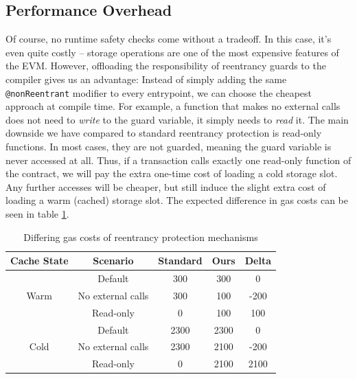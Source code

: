 \subsection{Performance Overhead}

Of course, no runtime safety checks come without a tradeoff. In this case, it's even quite costly -- storage operations are one of the most expensive features of the EVM. However, offloading the responsibility of reentrancy guards to the compiler gives us an advantage: Instead of simply adding the same \lstinline{@nonReentrant} modifier to every entrypoint, we can choose the cheapest approach at compile time. For example, a function that makes no external calls does not need to \textit{write} to the guard variable, it simply needs to \textit{read} it. The main downside we have compared to standard reentrancy protection is read-only functions. In most cases, they are not guarded, meaning the guard variable is never accessed at all. Thus, if a transaction calls exactly one read-only function of the contract, we will pay the extra one-time cost of loading a cold storage slot. Any further accesses will be cheaper, but still induce the slight extra cost of loading a warm (cached) storage slot. The expected difference in gas costs can be seen in table  \ref{table:reentrancygascosts}.

\begin{table}[h!]
\centering
{\setlength{\extrarowheight}{5pt}
\begin{tabular}{  c  c  c  c  c  }
 \toprule
 Cache State & Scenario               & Standard & Ours & Delta \\ [4pt]
 \midrule
                       & Default                 & 300          & 300    &  \cellcolor{yellow!25}0       \\ [3pt]
 Warm           & No external calls & 300          & 100    & \cellcolor{green!25}-200    \\[3pt]
                       & Read-only            & 0              & 100    & \cellcolor{red!25}100          \\[3pt]
                       & Default                 &  2300       & 2300  &  \cellcolor{yellow!25}0        \\[3pt]
 Cold             & No external calls &  2300        & 2100  & \cellcolor{green!25}-200    \\[3pt]
                       & Read-only            &  0             & 2100  & \cellcolor{red!25}2100         \\[3pt]
 \bottomrule
\end{tabular}
}
\caption{Differing gas costs of reentrancy protection mechanisms}
\label{table:reentrancygascosts}
\end{table}

